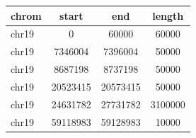 \documentclass{standalone}
\begin{document}
\begin{tabular}{|l|c|c|c|}
\toprule
chrom & start & end & length \\
\midrule
chr19 & 0 & 60000 & 60000 \\
chr19 & 7346004 & 7396004 & 50000 \\
chr19 & 8687198 & 8737198 & 50000 \\
chr19 & 20523415 & 20573415 & 50000 \\
chr19 & 24631782 & 27731782 & 3100000 \\
chr19 & 59118983 & 59128983 & 10000 \\
\bottomrule
\end{tabular}
\end{document}
